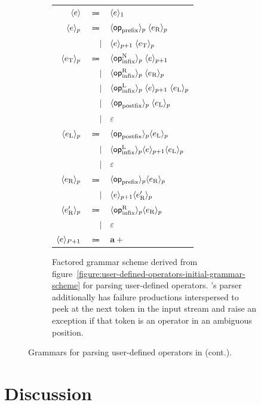 \begin{figure}\ContinuedFloat
\begin{subfigure}{\linewidth}
\centering
\begin{tabular}{rrl}
$ \langle e\rangle $ & $ \Coloneqq $ & $ \langle e\rangle_1 $\\
$ \langle e\rangle_p $ & $ \Coloneqq $ & $ \langle\mathsf{op}_{\text{prefix}}\rangle_p \; \langle e_\text{R}\rangle_p $\\
& $ \mid $ & $ \langle e\rangle_{p + 1} \; \langle e_\text{T}\rangle_p $\\
$ \langle e_\text{T}\rangle_p $ & $ \Coloneqq $ & $ \langle\mathsf{op}_{\text{infix}}^\text{N}\rangle_p \; \langle e\rangle_{p + 1} $\\
& $ \mid $ & $ \langle\mathsf{op}_{\text{infix}}^\text{R}\rangle_p \; \langle e_\text{R}\rangle_p $\\
& $ \mid $ & $ \langle\mathsf{op}_{\text{infix}}^\text{L}\rangle_p \; \langle e\rangle_{p + 1} \; \langle e_\text{L}\rangle_p $\\
& $ \mid $ & $ \langle\mathsf{op}_{\text{postfix}}\rangle_p \; \langle e_\text{L}\rangle_p $\\
& $ \mid $ & $ \varepsilon $\\
$ \langle e_\text{L}\rangle_p $ & $ \Coloneqq $ & $ \langle\mathsf{op}_{\text{postfix}}\rangle_p \langle e_\text{L}\rangle_p $\\
& $ \mid $ & $ \langle\mathsf{op}_{\text{infix}}^\text{L}\rangle_p \langle e\rangle_{p + 1} \langle e_\text{L}\rangle_p $\\
& $ \mid $ & $ \varepsilon $\\
$ \langle e_\text{R}\rangle_p $ & $ \Coloneqq $ & $ \langle\mathsf{op}_{\text{prefix}}\rangle_p \langle e_\text{R}\rangle_p $\\
& $ \mid $ & $ \langle e\rangle_{p + 1} \langle e_\text{R}'\rangle_p $\\
$ \langle e_\text{R}'\rangle_p $ & $ \Coloneqq $ & $ \langle\mathsf{op}_{\text{infix}}^\text{R}\rangle_p \langle e_\text{R}\rangle_p $\\
& $ \mid $ & $ \varepsilon $\\
$ \langle e\rangle_{P + 1} $ & $ \Coloneqq $ & $ \mathbf{a}+ $
\end{tabular}
\caption{Factored grammar scheme derived from figure~\ref{figure:user-defined-operators-initial-grammar-scheme} for parsing user-defined operators.
\Beluga's parser additionally has failure productions interspersed to peek at the next token in the input stream and raise an exception if that token is an operator in an ambiguous position.}
\label{figure:user-defined-operators-final-grammar-scheme}
\end{subfigure}
\caption[]{Grammars for parsing user-defined operators in \Beluga (cont.).}
\end{figure}

\section{Discussion}

